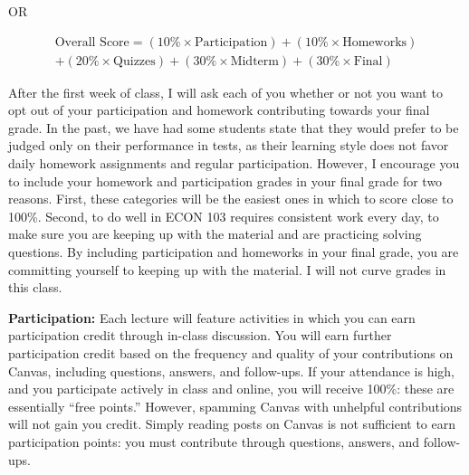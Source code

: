 \documentclass[11pt, letterpaper]{article}
\begin{document}
OR

	\begin{equation*}
	\begin{split}
		\mbox{Overall Score} =
(10\% \times \mbox{Participation})  + 
		 (10\% \times \mbox{Homeworks})  \\
		 + (20\% \times \mbox{Quizzes}) 
		 + (30\% \times \mbox{Midterm}) + (30\% \times \mbox{Final})
	\end{split}
	\end{equation*}
\medskip

After the first week of class, I will ask each of you whether or not you want to opt out of your
participation and homework contributing towards your final grade. In the past, we have had some
students state that they would prefer to be judged only on their performance in tests, as their
learning style does not favor daily homework assignments and regular participation. However,
I encourage you to include your homework and participation grades in your final grade for two
reasons. First, these categories will be the easiest ones in which to score close to 100\%. Second, to
do well in ECON 103 requires consistent work every day, to make sure you are keeping up with the
material and are practicing solving questions. By including participation and homeworks in your
final grade, you are committing yourself to keeping up with the material. I will not curve grades in this class.


\medskip



\noindent \textbf{Participation:} Each lecture will feature activities in which you can earn participation credit
through in-class discussion. You will earn further participation credit based on the frequency and
quality of your contributions on Canvas, including questions, answers, and follow-ups. If your
attendance is high, and you participate actively in class and online, you will receive 100\%: these
are essentially “free points.” However, spamming Canvas with unhelpful contributions will not gain
you credit. Simply reading posts on Canvas is not sufficient to earn participation points: you must
contribute through questions, answers, and follow-ups.
\end{document}
